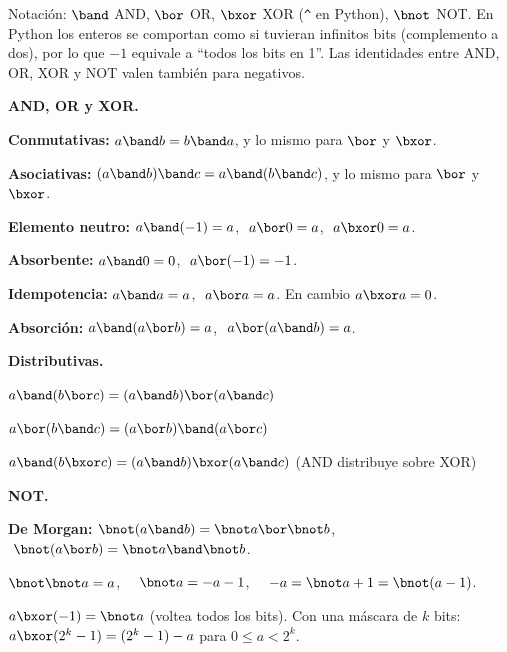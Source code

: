 Notación: \(\band\) AND, \(\bor\) OR, \(\bxor\) XOR (\texttt{\textasciicircum{}} en Python), \(\bnot\) NOT. En Python los enteros se comportan como si tuvieran infinitos bits (complemento a dos), por lo que \(-1\) equivale a ``todos los bits en 1''. Las identidades entre AND, OR, XOR y NOT valen también para negativos.

\textbf{AND, OR y XOR.}
\begin{props}
  \item \textbf{Conmutativas:} \(a \band b = b \band a\), y lo mismo para \(\bor\) y \(\bxor\).
  \item \textbf{Asociativas:} \((a \band b) \band c = a \band (b \band c)\), y lo mismo para \(\bor\) y \(\bxor\).
  \item \textbf{Elemento neutro:} \(a \band (-1) = a\), \(\ a \bor 0 = a\), \(\ a \bxor 0 = a\).
  \item \textbf{Absorbente:} \(a \band 0 = 0\), \(\ a \bor (-1) = -1\).
  \item \textbf{Idempotencia:} \(a \band a = a\), \(\ a \bor a = a\). En cambio \(a \bxor a = 0\).
  \item \textbf{Absorción:} \(a \band (a \bor b) = a\), \(\ a \bor (a \band b) = a\).
\end{props}

\textbf{Distributivas.}
\begin{props}
  \item \(a \band (b \bor c) = (a \band b) \bor (a \band c)\)
  \item \(a \bor (b \band c) = (a \bor b) \band (a \bor c)\)
  \item \(a \band (b \bxor c) = (a \band b) \bxor (a \band c)\) \quad (AND distribuye sobre XOR)
\end{props}

\textbf{NOT.}
\begin{props}
  \item \textbf{De Morgan:} \(\bnot(a \band b) = \bnot a \bor \bnot b\), \(\ \bnot(a \bor b) = \bnot a \band \bnot b\).
  \item \(\bnot \bnot a = a\), \(\quad \bnot a = -a - 1\), \(\quad -a = \bnot a + 1 = \bnot(a - 1)\).
  \item \(a \bxor (-1) = \bnot a\) (voltea todos los bits). Con una máscara de \(k\) bits: \(a \bxor (2^k - 1) = (2^k - 1) - a\) para \(0 \le a < 2^k\).
\end{props}

